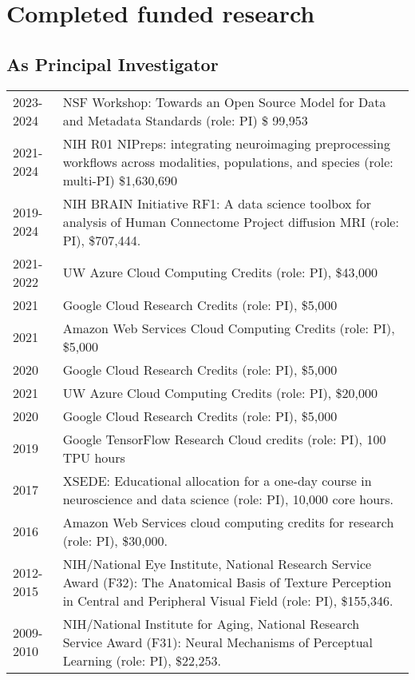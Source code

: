 \documentclass[11pt,fullpage]{article}
\begin{document}
\section*{Completed funded research}

\subsection*{As Principal Investigator}
\begin{tabular}{p{}p{}}

2023-2024 & NSF Workshop: Towards an Open Source Model for Data and Metadata Standards (role: PI) \$ 99,953\\
2021-2024 & NIH R01 NIPreps: integrating neuroimaging preprocessing workflows across modalities, populations, and species (role: multi-PI) \$1,630,690 \\
2019-2024 & NIH BRAIN Initiative RF1: A data science toolbox for analysis of Human Connectome Project diffusion MRI (role: PI), \$707,444.\\
2021-2022 & UW Azure Cloud Computing Credits (role: PI), \$43,000\\
2021 & Google Cloud Research Credits (role: PI), \$5,000\\
2021 & Amazon Web Services Cloud Computing Credits (role: PI), \$5,000 \\
2020 & Google Cloud Research Credits (role: PI), \$5,000\\
2021 & UW Azure Cloud Computing Credits (role: PI), \$20,000\\
2020 & Google Cloud Research Credits (role: PI), \$5,000\\
2019 & Google TensorFlow Research Cloud credits (role: PI), 100 TPU hours \\
2017 & XSEDE: Educational allocation for a one-day course in neuroscience and data science (role: PI), 10,000 core hours. \\
2016 & Amazon Web Services cloud computing credits for research (role: PI), \$30,000. \\
2012-2015 & NIH/National Eye Institute, National Research Service Award (F32): The Anatomical Basis of Texture Perception in Central and Peripheral Visual Field (role: PI),  \$155,346. \\
2009-2010 & NIH/National Institute for Aging, National Research Service Award (F31): Neural Mechanisms of Perceptual Learning (role: PI), \$22,253. \\
\end{tabular}
\end{document}
